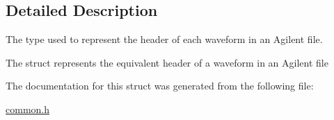 \subsection{Detailed Description}
The type used to represent the header of each waveform in an Agilent file. 

The struct represents the equivalent header of a waveform in an Agilent file 

The documentation for this struct was generated from the following file:\begin{DoxyCompactItemize}
\item 
\hyperlink{common_8h}{common.h}\end{DoxyCompactItemize}
